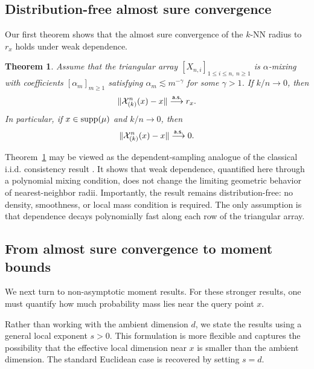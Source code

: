 \documentclass[12pt]{article}
\newtheorem{theorem}{Theorem}
\theoremstyle{definition}
\begin{document}

\subsection{Distribution-free almost sure convergence}

Our first theorem shows that the almost sure convergence of the $k$-NN radius to $r_x$ holds under weak dependence.

\begin{theorem}\label{thm:as}
Assume that the triangular array $[X_{n,i}]_{1 \le i \le n,\ n \ge 1}$ is $\alpha$-mixing with coefficients $[\alpha_m]_{m \ge 1}$ satisfying $\alpha_m \lesssim m^{-\gamma}$ for some $\gamma>1$. If $k/n \to 0$, then
\[
\|\mathcal X_{(k)}^n(x)-x\| \stackrel{\sf a.s.}{\longrightarrow} r_x.
\]
In particular, if $x \in {\rm supp}(\mu)$ and $k/n \to 0$, then
\[
\|\mathcal X_{(k)}^n(x)-x\| \stackrel{\sf a.s.}{\longrightarrow} 0.
\]
\end{theorem}

Theorem~\ref{thm:as} may be viewed as the dependent-sampling analogue of the classical i.i.d. consistency result \citep[Lemma 2.2]{biau2015lectures}. It shows that weak dependence, quantified here through a polynomial mixing condition, does not change the limiting geometric behavior of nearest-neighbor radii. Importantly, the result remains distribution-free: no density, smoothness, or local mass condition is required. The only assumption is that dependence decays polynomially fast along each row of the triangular array.


\subsection{From almost sure convergence to moment bounds}

We next turn to non-asymptotic moment results. For these stronger results, one must quantify how much probability mass lies near the query point $x$.

Rather than working with the ambient dimension $d$, we state the results using a general local exponent $s>0$. This formulation is more flexible and captures the possibility that the effective local dimension near $x$ is smaller than the ambient dimension. The standard Euclidean case is recovered by setting $s=d$.
\end{document}
